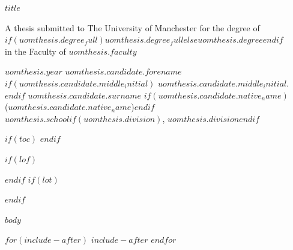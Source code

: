 \documentclass[$if(fontsize)$$fontsize$,$endif$a4paper]{report}
\begin{document}
\begin{titlepage}
\centering
\vspace*{6cm}
{\Large\bfseries $title$\par}
\vspace{3cm}
A thesis submitted to The University of Manchester for the degree of\\
$if(uomthesis.degree_full)$$uomthesis.degree_full$$else$$uomthesis.degree$$endif$\\
in the Faculty of $uomthesis.faculty$
\vspace{3cm}

$uomthesis.year$
\vfill
$uomthesis.candidate.forename$$if(uomthesis.candidate.middle_initial)$ $uomthesis.candidate.middle_initial$.$endif$ $uomthesis.candidate.surname$
$if(uomthesis.candidate.native_name)$\\($uomthesis.candidate.native_name$)$endif$\\[1ex]
$uomthesis.school$$if(uomthesis.division)$, $uomthesis.division$$endif$
\end{titlepage}

$if(toc)$
\setcounter{tocdepth}{$toc-depth$}
\tableofcontents
$endif$

$if(lof)$\listoffigures$endif$
$if(lot)$\listoftables$endif$

$body$

$for(include-after)$
$include-after$
$endfor$
\end{document}
